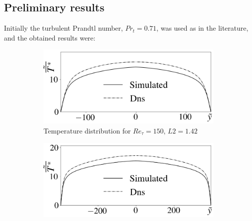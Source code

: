 \documentclass[10pt]{article} %
\begin{document}
\subsection{Preliminary results}
Initially the turbulent Prandtl number, $Pr_t = 0.71$, was used as in the literature, and the obtained results were:\\
	\begin{figure}[h!]
		\centering
		\begin{subfigure}[t]{0.49\textwidth}
		\centering
		\includegraphics[angle=0, scale=0.28]{fotos_formatacao_final/Temperature_150_071_classico}
		\caption{Temperature distribution for $Re_\tau = 150$, $L2 = 1.42$}
		\end{subfigure}
		\begin{subfigure}[t]{0.49\textwidth}
		\centering
		\includegraphics[angle=0, scale=0.28]{fotos_formatacao_final/Temperature_395_071_classico}

\end{subfigure}
\end{figure}
\end{document}

